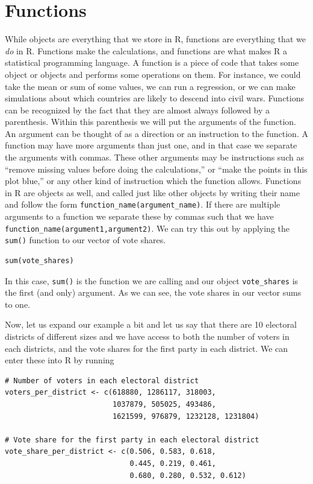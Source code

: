 \documentclass[
]{book}
\begin{document}
\hypertarget{functions}{%
\section{Functions}\label{functions}}

While objects are everything that we store in R, functions are everything that we \emph{do} in R. Functions make the calculations, and functions are what makes R a statistical programming language. A function is a piece of code that takes some object or objects and performs some operations on them. For instance, we could take the mean or sum of some values, we can run a regression, or we can make simulations about which countries are likely to descend into civil wars. Functions can be recognized by the fact that they are almost always followed by a parenthesis. Within this parenthesis we will put the arguments of the function. An argument can be thought of as a direction or an instruction to the function. A function may have more arguments than just one, and in that case we separate the arguments with commas. These other arguments may be instructions such as ``remove missing values before doing the calculations,'' or ``make the points in this plot blue,'' or any other kind of instruction which the function allows. Functions in R are objects as well, and called just like other objects by writing their name and follow the form \texttt{function\_name(argument\_name)}. If there are multiple arguments to a function we separate these by commas such that we have \texttt{function\_name(argument1,argument2)}. We can try this out by applying the \texttt{sum()} function to our vector of vote shares.

\begin{verbatim}
sum(vote_shares)
\end{verbatim}

In this case, \texttt{sum()} is the function we are calling and our object \texttt{vote\_shares} is the first (and only) argument. As we can see, the vote shares in our vector sums to one.

Now, let us expand our example a bit and let us say that there are 10 electoral districts of different sizes and we have access to both the number of voters in each districts, and the vote shares for the first party in each district. We can enter these into R by running

\begin{verbatim}
# Number of voters in each electoral district
voters_per_district <- c(618880, 1286117, 318003, 
                         1037879, 505025, 493486, 
                         1621599, 976879, 1232128, 1231804) 

# Vote share for the first party in each electoral district
vote_share_per_district <- c(0.506, 0.583, 0.618, 
                             0.445, 0.219, 0.461, 
                             0.680, 0.280, 0.532, 0.612) 
\end{verbatim}
\end{document}
